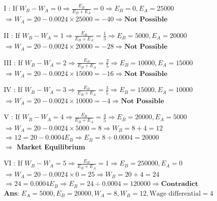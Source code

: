 \documentclass[12pt]{article}
\begin{document}
\begin{enumerate}
    \begin{enumerate}
        \item [I]: If $W_B - W_A = 0 \Rightarrow \frac{E_B}{E_B + E_A} = 0 \Rightarrow E_B = 0, E_A = 25000$\\
        $\Rightarrow W_A = 20 - 0.0024 \times 25000 = -40 \Rightarrow \textbf{Not Possible}$
        \item [II]: If $W_B - W_A = 1 \Rightarrow \frac{E_B}{E_B + E_A} = \frac{1}{5} \Rightarrow E_B = 5000, E_A = 20000$\\
        $\Rightarrow W_A = 20 - 0.0024 \times 20000 = -28 \Rightarrow \textbf{Not Possible}$
        \item [III]: If $W_B - W_A = 2 \Rightarrow \frac{E_B}{E_B + E_A} = \frac{2}{5} \Rightarrow E_B = 10000, E_A = 15000$\\
        $\Rightarrow W_A = 20 - 0.0024 \times 15000 = -16 \Rightarrow \textbf{Not Possible}$
        \item [IV]: If $W_B - W_A = 3 \Rightarrow \frac{E_B}{E_B + E_A} = \frac{3}{5} \Rightarrow E_B = 15000, E_A = 10000$\\
        $\Rightarrow W_A = 20 - 0.0024 \times 10000 = -4 \Rightarrow \textbf{Not Possible}$
        \item [V]: If $W_B - W_A = 4 \Rightarrow \frac{E_B}{E_B + E_A} = \frac{4}{5} \Rightarrow E_B = 20000, E_A = 5000$\\
        $\Rightarrow W_A = 20 - 0.0024 \times 5000 = 8 \Rightarrow W_B = 8 + 4 = 12$\\
        $\Rightarrow 12 = 20 - 0.0004E_B \Rightarrow E_B = 8 \div 0.0004 = 20000$\\
        $\Rightarrow$ \textbf{Market Equilibrium}
        \item [VI]: If $W_B - W_A = 5 \Rightarrow \frac{E_B}{E_B + E_A} = 1 \Rightarrow E_B = 250000, E_A = 0$\\
        $\Rightarrow W_A = 20 - 0.0024 \times 0 = 25 \Rightarrow W_B = 20 + 4 = 24$\\
        $\Rightarrow 24 = 0.0004E_B \Rightarrow E_B = 24 \div 0.0004 = 120000 \Rightarrow \textbf{Contradict}$\\

        \textbf{Ans}: $E_A = 5000, E_B = 20000, W_A = 8, W_B = 12, \text{Wage differential} = 4$
        
    \end{enumerate}

\end{enumerate}
\end{document}
